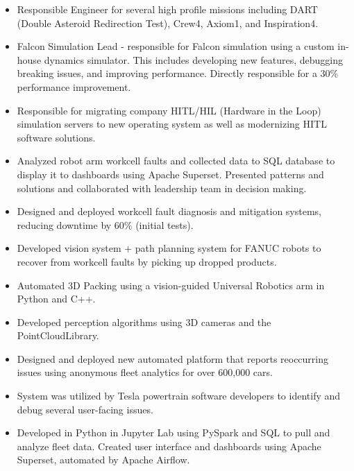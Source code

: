     \begin{itemize}
        \item Responsible Engineer for several high profile missions including DART (Double Asteroid Redirection Test), Crew4, Axiom1, and Inspiration4.
        \item Falcon Simulation Lead - responsible for Falcon simulation using a custom in-house dynamics simulator. This includes developing new features, debugging breaking issues, and improving performance. Directly responsible for a 30\% performance improvement.
        \item Responsible for migrating company HITL/HIL (Hardware in the Loop) simulation servers to new operating system as well as modernizing HITL software solutions.
    \end{itemize}
\divider
{}
    \begin{itemize}
        \item Analyzed robot arm workcell faults and collected data to SQL database to display it to dashboards using Apache Superset. Presented patterns and solutions and collaborated with leadership team in decision making.
        \item Designed and deployed workcell fault diagnosis and mitigation systems, reducing downtime by 60\% (initial tests).
        \item Developed vision system + path planning system for FANUC robots to recover from workcell faults by picking up dropped products.
    \end{itemize}
{}
    \begin{itemize}
        \item Automated 3D Packing using a vision-guided Universal Robotics arm in Python and C++.
        \item Developed perception algorithms using 3D cameras and the PointCloudLibrary.
    \end{itemize}
\divider
{}
    \begin{itemize}
        \item Designed and deployed new automated platform that reports reoccurring issues using anonymous fleet analytics for over 600,000 cars.
        \item System was utilized by Tesla powertrain software developers to identify and debug several user-facing issues.
        \item Developed in Python in Jupyter Lab using PySpark and SQL to pull and analyze fleet data. Created user interface and dashboards using Apache Superset, automated by Apache Airflow.
    \end{itemize}
